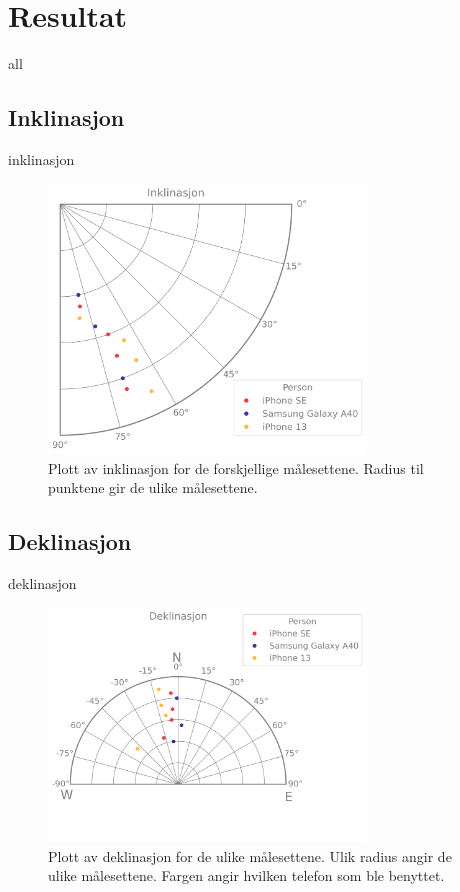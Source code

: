 \section{Resultat}

{all}

\subsection{Inklinasjon}

{inklinasjon}

\begin{figure}
    \centering
    \includegraphics[width=0.75\textwidth]{Plots/inclination.png}
    \caption{Plott av inklinasjon for de forskjellige målesettene. Radius til punktene gir de ulike målesettene.}
    
    \label{fig:plot_inklination}
\end{figure}


\subsection{Deklinasjon}

{deklinasjon}

\begin{figure}
    \centering
    \includegraphics[width=0.75\textwidth]{Plots/declination.png}
    \caption{Plott av deklinasjon for de ulike målesettene. Ulik radius angir de ulike målesettene. Fargen angir hvilken telefon som ble benyttet.}
    \label{fig:plot_declination}
\end{figure}


